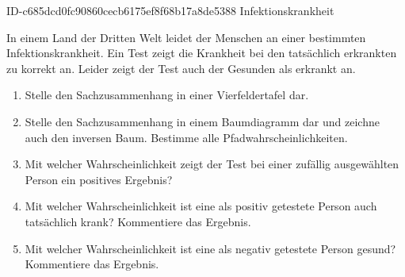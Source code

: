 \begin{exercise}
      {ID-c685dcd0fc90860cecb6175ef8f68b17a8de5388}
      {Infektionskrankheit}
  \ifproblem\problem\par
    In einem Land der Dritten Welt leidet  der Menschen an einer
    bestimmten Infektionskrankheit. Ein Test zeigt die Krankheit bei den
    tatsächlich erkrankten zu  korrekt an. Leider zeigt der Test
    auch  der Gesunden als erkrankt an.
    \begin{enumerate}
      \item Stelle den Sachzusammenhang in einer Vierfeldertafel dar.
      \item Stelle den Sachzusammenhang in einem Baumdiagramm dar und zeichne
            auch den inversen Baum. Bestimme alle Pfadwahrscheinlichkeiten.
      \item Mit welcher Wahrscheinlichkeit zeigt der Test bei einer zufällig
            ausgewählten Person ein positives Ergebnis?
      \item Mit welcher Wahrscheinlichkeit ist eine als positiv getestete
            Person auch tatsächlich krank? Kommentiere das Ergebnis.
      \item Mit welcher Wahrscheinlichkeit ist eine als negativ getestete
            Person gesund? Kommentiere das Ergebnis.
    \end{enumerate}
  \fi
\end{exercise}
